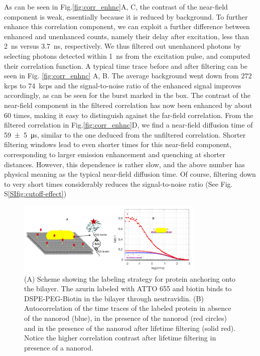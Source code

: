 As can be seen in Fig.\ref{fig:corr_enhnc}A, C, the contrast of the near-field component is weak, essentially because it is reduced by background.
To further enhance this correlation component, we can exploit a further difference between enhanced and unenhanced counts, namely their delay after excitation, less than \SI{2}{\ns} 
versus \SI{3.7}{\ns}, respectively.
We thus filtered out unenhanced photons by selecting photons detected within \SI{1}{\ns} from the excitation pulse, and computed their correlation function.
A typical time trace before and after filtering can be seen in Fig. \ref{fig:corr_enhnc} A, B.
The average background went down from $272~$kcps to \SI{74}{kcps}  and the signal-to-noise ratio of the enhanced signal improves accordingly, as can be seen for the burst marked in the box. 
The contrast of the near-field component in the filtered correlation has now been enhanced by about 60 times, making it easy to distinguish against the far-field correlation.
From the filtered correlation in Fig.\ref{fig:corr_enhnc}D, we find a near-field diffusion time of \SI[separate-uncertainty = true]{59(5)}{\us}, similar to the one deduced from the unfiltered correlation.
Shorter filtering windows lead to even shorter times for this near-field component, corresponding to larger emission enhancement and quenching at shorter distances.
However, this dependence is rather slow, and the above number has physical meaning as the typical near-field diffusion time.
Of course, filtering down to very short times considerably reduces the signal-to-noise ratio (See Fig. S\ref{SIfig:cutoff-effect})

\begin{figure}[ht]
	\centering
	\includegraphics[width=0.8\textwidth]{Zn_azurin_efcs}
	\caption{(A) Scheme showing the labeling strategy for protein anchoring onto the bilayer.
	The azurin labeled with ATTO 655 and biotin binds to DSPE-PEG-Biotin in the bilayer through neutravidin.
	(B) Autocorrelation of the time traces of the labeled protein in absence of the nanorod (blue), in the presence of the nanorod (red circles) 
	and in the presence of the nanorod after lifetime filtering (solid red).
	Notice the higher correlation contrast after lifetime filtering in presence of a nanorod.}
	\label{fig:Zn_azurin_efcs}
\end{figure}

